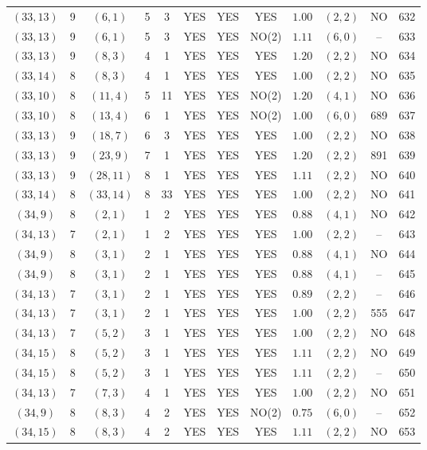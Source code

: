 \begin{longtable}{|c|c|c|c|c|c|c|c|c|c|c|c|}
$(33,13)$ & 9 & $(6,1)$ & 5 & 3 & YES & YES & YES & $1.00$ & $(2,2)$ & NO & 632\\
$(33,13)$ & 9 & $(6,1)$ & 5 & 3 & YES & YES & NO(2) & $1.11$ & $(6,0)$ & -- & 633\\
$(33,13)$ & 9 & $(8,3)$ & 4 & 1 & YES & YES & YES & $1.20$ & $(2,2)$ & NO & 634\\
$(33,14)$ & 8 & $(8,3)$ & 4 & 1 & YES & YES & YES & $1.00$ & $(2,2)$ & NO & 635\\
$(33,10)$ & 8 & $(11,4)$ & 5 & 11 & YES & YES & NO(2) & $1.20$ & $(4,1)$ & NO & 636\\
$(33,10)$ & 8 & $(13,4)$ & 6 & 1 & YES & YES & NO(2) & $1.00$ & $(6,0)$ & 689 & 637\\
$(33,13)$ & 9 & $(18,7)$ & 6 & 3 & YES & YES & YES & $1.00$ & $(2,2)$ & NO & 638\\
$(33,13)$ & 9 & $(23,9)$ & 7 & 1 & YES & YES & YES & $1.20$ & $(2,2)$ & 891 & 639\\
$(33,13)$ & 9 & $(28,11)$ & 8 & 1 & YES & YES & YES & $1.11$ & $(2,2)$ & NO & 640\\
$(33,14)$ & 8 & $(33,14)$ & 8 & 33 & YES & YES & YES & $1.00$ & $(2,2)$ & NO & 641\\
$(34,9)$ & 8 & $(2,1)$ & 1 & 2 & YES & YES & YES & $0.88$ & $(4,1)$ & NO & 642\\
$(34,13)$ & 7 & $(2,1)$ & 1 & 2 & YES & YES & YES & $1.00$ & $(2,2)$ & -- & 643\\
$(34,9)$ & 8 & $(3,1)$ & 2 & 1 & YES & YES & YES & $0.88$ & $(4,1)$ & NO & 644\\
$(34,9)$ & 8 & $(3,1)$ & 2 & 1 & YES & YES & YES & $0.88$ & $(4,1)$ & -- & 645\\
$(34,13)$ & 7 & $(3,1)$ & 2 & 1 & YES & YES & YES & $0.89$ & $(2,2)$ & -- & 646\\
$(34,13)$ & 7 & $(3,1)$ & 2 & 1 & YES & YES & YES & $1.00$ & $(2,2)$ & 555 & 647\\
$(34,13)$ & 7 & $(5,2)$ & 3 & 1 & YES & YES & YES & $1.00$ & $(2,2)$ & NO & 648\\
$(34,15)$ & 8 & $(5,2)$ & 3 & 1 & YES & YES & YES & $1.11$ & $(2,2)$ & NO & 649\\
$(34,15)$ & 8 & $(5,2)$ & 3 & 1 & YES & YES & YES & $1.11$ & $(2,2)$ & -- & 650\\
$(34,13)$ & 7 & $(7,3)$ & 4 & 1 & YES & YES & YES & $1.00$ & $(2,2)$ & NO & 651\\
$(34,9)$ & 8 & $(8,3)$ & 4 & 2 & YES & YES & NO(2) & $0.75$ & $(6,0)$ & -- & 652\\
$(34,15)$ & 8 & $(8,3)$ & 4 & 2 & YES & YES & YES & $1.11$ & $(2,2)$ & NO & 653\\

\end{longtable}
